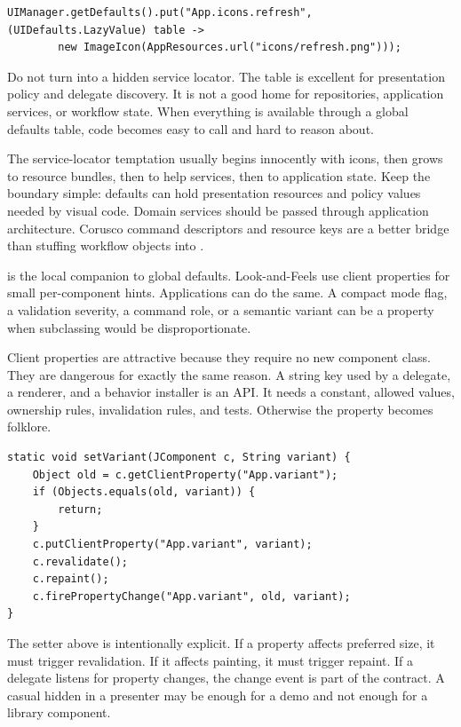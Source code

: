 \begin{lstlisting}[caption={A lazy default for an icon.}]
UIManager.getDefaults().put("App.icons.refresh", (UIDefaults.LazyValue) table ->
        new ImageIcon(AppResources.url("icons/refresh.png")));
\end{lstlisting}

Do not turn  into a hidden service locator. The table is excellent for presentation policy and delegate discovery. It is not a good home for repositories, application services, or workflow state. When everything is available through a global defaults table, code becomes easy to call and hard to reason about.

The service-locator temptation usually begins innocently with icons, then grows to resource bundles, then to help services, then to application state. Keep the boundary simple: defaults can hold presentation resources and policy values needed by visual code. Domain services should be passed through application architecture. Corusco command descriptors and resource keys are a better bridge than stuffing workflow objects into .

 is the local companion to global defaults. Look-and-Feels use client properties for small per-component hints. Applications can do the same. A compact mode flag, a validation severity, a command role, or a semantic variant can be a property when subclassing would be disproportionate.

Client properties are attractive because they require no new component class. They are dangerous for exactly the same reason. A string key used by a delegate, a renderer, and a behavior installer is an API. It needs a constant, allowed values, ownership rules, invalidation rules, and tests. Otherwise the property becomes folklore.

\begin{lstlisting}[caption={A client property setter that owns invalidation.}]
static void setVariant(JComponent c, String variant) {
    Object old = c.getClientProperty("App.variant");
    if (Objects.equals(old, variant)) {
        return;
    }
    c.putClientProperty("App.variant", variant);
    c.revalidate();
    c.repaint();
    c.firePropertyChange("App.variant", old, variant);
}
\end{lstlisting}

The setter above is intentionally explicit. If a property affects preferred size, it must trigger revalidation. If it affects painting, it must trigger repaint. If a delegate listens for property changes, the change event is part of the contract. A casual  hidden in a presenter may be enough for a demo and not enough for a library component.

